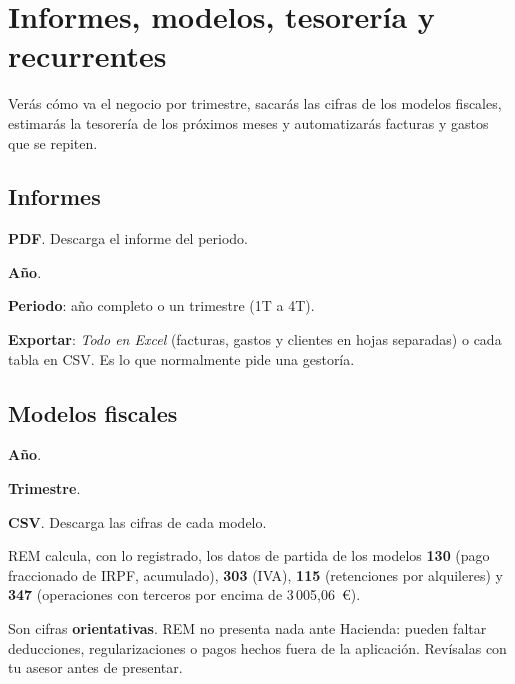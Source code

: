 \chapter{Informes, modelos, tesorería y recurrentes}\label{cap:informes}

\begin{objbox}
Verás cómo va el negocio por trimestre, sacarás las cifras de los modelos fiscales, estimarás la tesorería de los próximos meses y automatizarás facturas y gastos que se repiten.
\end{objbox}

\section{Informes}
\begin{leyenda}
\item[\mk{1}] \textbf{PDF}. Descarga el informe del periodo.
\item[\mk{2}] \textbf{Año}.
\item[\mk{3}] \textbf{Periodo}: año completo o un trimestre (1T a 4T).
\item[\mk{4}] \textbf{Exportar}: \emph{Todo en Excel} (facturas, gastos y clientes en hojas separadas) o cada tabla en CSV. Es lo que normalmente pide una gestoría.
\end{leyenda}

\section{Modelos fiscales}
\begin{leyenda}
\item[\mk{1}] \textbf{Año}.
\item[\mk{2}] \textbf{Trimestre}.
\item[\mk{3}] \textbf{CSV}. Descarga las cifras de cada modelo.
\end{leyenda}
REM calcula, con lo registrado, los datos de partida de los modelos \textbf{130} (pago fraccionado de IRPF, acumulado), \textbf{303} (IVA), \textbf{115} (retenciones por alquileres) y \textbf{347} (operaciones con terceros por encima de 3\,005,06~€).

\begin{warnbox}
Son cifras \textbf{orientativas}. REM no presenta nada ante Hacienda: pueden faltar deducciones, regularizaciones o pagos hechos fuera de la aplicación. Revísalas con tu asesor antes de presentar.
\end{warnbox}

